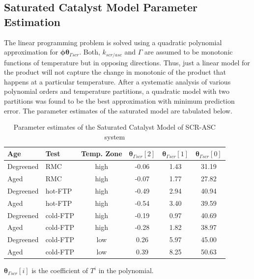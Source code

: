 \subsection{Saturated Catalyst Model Parameter Estimation}

The linear programming problem is solved using a quadratic polynomial approximation for $\pmb \phi \pmb \theta_{\Gamma scr}$. Both, $k_{scr/asc}$ and $\Gamma$ are assumed to be monotonic functions of temperature but in opposing directions. Thus, just a linear model for the product will not capture the change in monotonic of the product that happens at a particular temperature. After a systematic analysis of various polynomial orders and temperature partitions, a quadratic model with two partitions was found to be the best approximation with minimum prediction error. The parameter estimates of the saturated model are tabulated below.

\begin{table}[H]
        \centering
        \caption{Parameter estimates of the Saturated Catalyst Model of SCR-ASC system}
        \begin{tabular}{l l c c c c}
                \hline \hline
                Age & Test & Temp. Zone &
                $\pmb \theta_{\Gamma scr}[2]$ &
                $\pmb \theta_{\Gamma scr}[1]$ &
                $\pmb \theta_{\Gamma scr}[0]$ \\ \hline \hline
                Degreened & RMC & high & -0.06 & 1.43 & 31.19 \\
                Aged & RMC & high & -0.07 & 1.77 & 27.82\\
                Degreened & hot-FTP & high & -0.49 & 2.94 & 40.94 \\
                Aged & hot-FTP & high & -0.54 & 3.40 & 39.59 \\
                Degreened & cold-FTP & high & -0.19 & 0.97 & 40.69 \\
                Aged & cold-FTP & high & -0.28 & 1.82 & 38.97\\
                Degreened & cold-FTP & low & 0.26 &  5.97 & 45.00 \\
                Aged & cold-FTP & low & 0.39 & 8.25 & 50.63 \\
                \hline \hline
        \end{tabular}

        $\pmb \theta_{\Gamma scr} [i]$ is the coefficient of $T^i$ in the polynomial.
\end{table}

